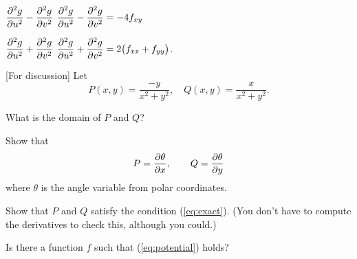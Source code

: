 \begin{multicols}{2}
\subprob $\dfrac{\partial^2 g}{\partial u^2} - \dfrac{\partial^2 g}{\partial v^2}$
\answer
$\dfrac{\partial^2 g}{\partial u^2} - \dfrac{\partial^2 g}{\partial v^2} = -4f_{xy} $
\endanswer

\subprob $\dfrac{\partial^2 g}{\partial u^2} + \dfrac{\partial^2 g}{\partial v^2}$
\answer
$\dfrac{\partial^2 g}{\partial u^2} + \dfrac{\partial^2 g}{\partial v^2} = 2\bigl(f_{xx}+f_{yy}\bigr)$.
\endanswer

\problem\label{prb:grad-of-theta} 
[For discussion] Let 
\[
  P(x,y) = \frac{-y}{x^2+y^2},
  \quad
  Q(x,y) = \frac{x}{x^2+y^2}.
\]

\subprob What is the domain of $P$ and $Q$?

\subprob Show that
\[
  P = \frac{\partial \theta}{\partial x}, \qquad
  Q = \frac{\partial \theta}{\partial y}
\]
where $\theta$ is the angle variable from polar coordinates.

\subprob Show that $P$ and $Q$ satisfy the condition
(\ref{eq:exact}).  (You don't have to compute the derivatives to
check this, although you could.)

\subprob Is there a function $f$ such that (\ref{eq:potential}) holds?

\noproblemfont
\end{multicols}

